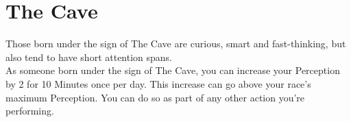 \section{The Cave}

Those born under the sign of The Cave are curious, smart and fast-thinking, but also tend to have short attention spans.\\
As someone born under the sign of The Cave, you can increase your Perception by 2 for 10 Minutes once per day. This increase can go above your race's maximum Perception. You can do so as part of any other action you're performing.\\